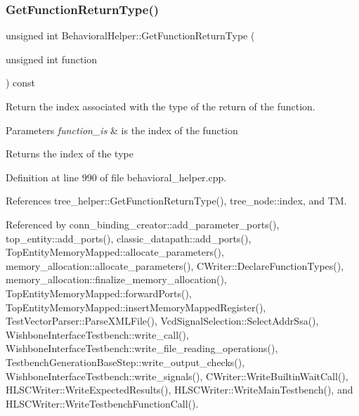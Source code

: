 \subsubsection{\texorpdfstring{Get\+Function\+Return\+Type()}{GetFunctionReturnType()}}
{\footnotesize\ttfamily unsigned int Behavioral\+Helper\+::\+Get\+Function\+Return\+Type (\begin{DoxyParamCaption}\item[{unsigned int}]{function }\end{DoxyParamCaption}) const}



Return the index associated with the type of the return of the function. 


\begin{DoxyParams}{Parameters}
{\em function\+\_\+is} & is the index of the function \\
\hline
\end{DoxyParams}
\begin{DoxyReturn}{Returns}
the index of the type 
\end{DoxyReturn}


Definition at line 990 of file behavioral\+\_\+helper.\+cpp.



References tree\+\_\+helper\+::\+Get\+Function\+Return\+Type(), tree\+\_\+node\+::index, and TM.



Referenced by conn\+\_\+binding\+\_\+creator\+::add\+\_\+parameter\+\_\+ports(), top\+\_\+entity\+::add\+\_\+ports(), classic\+\_\+datapath\+::add\+\_\+ports(), Top\+Entity\+Memory\+Mapped\+::allocate\+\_\+parameters(), memory\+\_\+allocation\+::allocate\+\_\+parameters(), C\+Writer\+::\+Declare\+Function\+Types(), memory\+\_\+allocation\+::finalize\+\_\+memory\+\_\+allocation(), Top\+Entity\+Memory\+Mapped\+::forward\+Ports(), Top\+Entity\+Memory\+Mapped\+::insert\+Memory\+Mapped\+Register(), Test\+Vector\+Parser\+::\+Parse\+X\+M\+L\+File(), Vcd\+Signal\+Selection\+::\+Select\+Addr\+Ssa(), Wishbone\+Interface\+Testbench\+::write\+\_\+call(), Wishbone\+Interface\+Testbench\+::write\+\_\+file\+\_\+reading\+\_\+operations(), Testbench\+Generation\+Base\+Step\+::write\+\_\+output\+\_\+checks(), Wishbone\+Interface\+Testbench\+::write\+\_\+signals(), C\+Writer\+::\+Write\+Builtin\+Wait\+Call(), H\+L\+S\+C\+Writer\+::\+Write\+Expected\+Results(), H\+L\+S\+C\+Writer\+::\+Write\+Main\+Testbench(), and H\+L\+S\+C\+Writer\+::\+Write\+Testbench\+Function\+Call().

